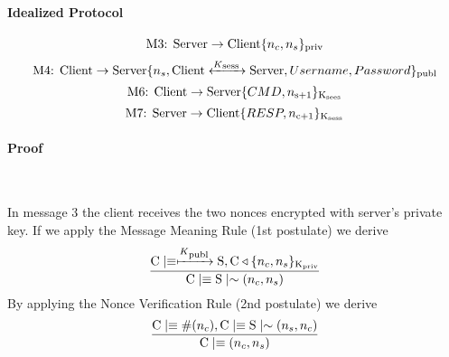 \paragraph{Idealized Protocol}
\[\textnormal{M3: Server} \rightarrow \textnormal{Client} \lbrace n_c,n_s \rbrace \textsubscript{priv} \]
\[\textnormal{M4: Client} \rightarrow \textnormal{Server} \lbrace n_s,\textnormal{Client} \xleftrightarrow{K\textsubscript{sess }} \textnormal{Server} ,Username,Password \rbrace \textsubscript{publ}\]
\[\textnormal{M6: Client} \rightarrow \textnormal{Server} \lbrace CMD,n\textsubscript{s+1} \rbrace \textsubscript{K\textsubscript{sees}}\]
\[\textnormal{M7: Server} \rightarrow \textnormal{Client} \lbrace RESP,n\textsubscript{c+1} \rbrace \textsubscript{K\textsubscript{sess}}\]

\paragraph{Proof}\mbox{} \\

\par In message 3 the client receives the two nonces encrypted with server's private key. If we apply the Message Meaning Rule (1st postulate) we derive
\[ \frac{\textnormal{C} \mid\equiv \xmapsto{K\textsubscript{publ}} \textnormal{S}, 	\textnormal{C} \triangleleft \lbrace n_c,n_s \rbrace \textsubscript{K\textsubscript{priv}}}
        {\textnormal{C} \mid\equiv \textnormal{S} \mid\sim (n_c,n_s)}  \]
By applying the Nonce Verification Rule (2nd postulate) we derive
\[ \frac{\textnormal{C} \mid\equiv \#(n_c), \textnormal{C} \mid\equiv \textnormal{S} \mid\sim (n_s,n_c)}{\textnormal{C} \mid\equiv (n_c,n_s)} \]

